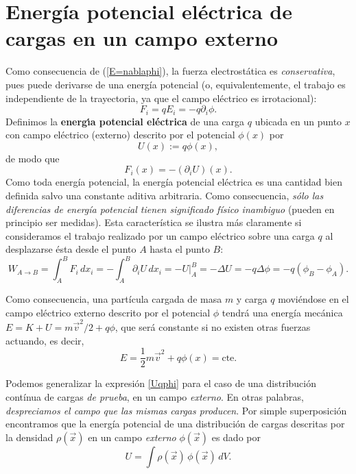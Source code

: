 \section{Energía potencial eléctrica de cargas en un campo externo}
Como consecuencia de (\ref{E=nablaphi}), la fuerza electrostática es
\textit{conservativa}, pues puede derivarse de una energía potencial (o,
equivalentemente, el trabajo es independiente de la trayectoria, ya que el campo
eléctrico es irrotacional):
\begin{equation}
\boxed{F_i=qE_i=-q\partial_i\phi .}
\end{equation}
Definimos la \textbf{energ\'{\i}a potencial eléctrica} de una carga $q$ ubicada en un punto $x$ con campo eléctrico (externo) descrito por el potencial $\phi(x)$ por
\begin{equation}
\boxed{U(x):=q\phi(x),} \label{Uqphi}
\end{equation}
de modo
que
\begin{equation}
\boxed{F_i(x)=-(\partial_iU)(x) .}
\end{equation}
Como toda energía potencial, la energía potencial eléctrica es una
cantidad bien definida salvo una constante aditiva arbitraria. Como
consecuencia, \textit{sólo las diferencias de energía potencial tienen
significado físico inambiguo} (pueden en principio ser medidas). Esta característica se
ilustra más claramente si consideramos el trabajo realizado por un campo
eléctrico sobre una carga $q$ al desplazarse ésta desde el punto $A$ hasta el
punto $B$:
\begin{equation}\label{WABDU}
W_{A\rightarrow B}=\int_A^B F_i\, dx_i=-\int_A^B
\partial_iU\,dx_i=-\left.U\right|_A^B=-\Delta U=-q\Delta\phi=-q(\phi_B-\phi_A).
\end{equation}

Como consecuencia, una partícula cargada de masa $m$ y carga $q$ moviéndose en el campo eléctrico externo descrito por el potencial $\phi$ tendrá una energía mecánica $E=K+U=m\vec{v}^2/2+q\phi$, que será constante si no existen otras fuerzas actuando, es decir,
\begin{equation}
E=\frac{1}{2}m\vec{v}^2+q\phi(x)=\text{cte.}
\end{equation}

Podemos generalizar la expresión \eqref{Uqphi} para el caso de una distribución contínua de cargas \textit{de prueba}, en un campo \textit{externo}. En otras palabras, \textit{despreciamos el campo que las mismas cargas producen}. Por simple superposición encontramos que la energía potencial de una distribución de cargas descritas por la densidad $\rho(\vec{x})$ en un campo \textit{externo} $\phi(\vec{x})$ es dado por
\begin{equation} \label{Urhophiext}
U=\int \rho(\vec{x})\,\phi(\vec{x})\,dV.
\end{equation}

